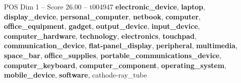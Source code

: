 \begin{textsample}{POS Dim 1 – Score 26.00 – t004947}  \label{ex:f1_pos_024}
\textbf{electronic\_device}, \textbf{laptop}, \textbf{display\_device}, \textbf{personal\_computer}, \textbf{netbook}, \textbf{computer}, \textbf{office\_equipment}, \textbf{gadget}, \textbf{output\_device}, \textbf{input\_device}, \textbf{computer\_hardware}, \textbf{technology}, \textbf{electronics}, \textbf{touchpad}, \textbf{communication\_device}, \textbf{flat-panel\_display}, \textbf{peripheral}, \textbf{multimedia}, \textbf{space\_bar}, \textbf{office\_supplies}, \textbf{portable\_communications\_device}, \textbf{computer\_keyboard}, \textbf{computer\_component}, \textbf{operating\_system}, \textbf{mobile\_device}, \textbf{software}, cathode-ray\_tube

\end{textsample}
